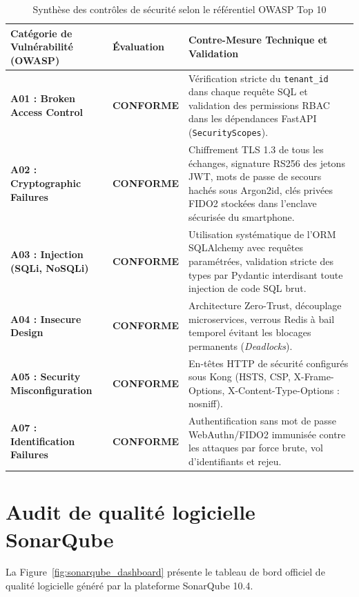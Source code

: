 \begin{table}[H]
\centering
\small
\renewcommand{\arraystretch}{1.3}
\begin{tabularx}{\textwidth}{|p{4.2cm}|p{2cm}|X|}
\hline
\textbf{Catégorie de Vulnérabilité (OWASP)} & \textbf{Évaluation} & \textbf{Contre-Mesure Technique et Validation} \\
\hline
\textbf{A01 : Broken Access Control} & \textbf{CONFORME} & Vérification stricte du \texttt{tenant\_id} dans chaque requête SQL et validation des permissions RBAC dans les dépendances FastAPI (\texttt{SecurityScopes}). \\
\hline
\textbf{A02 : Cryptographic Failures} & \textbf{CONFORME} & Chiffrement TLS 1.3 de tous les échanges, signature RS256 des jetons JWT, mots de passe de secours hachés sous Argon2id, clés privées FIDO2 stockées dans l'enclave sécurisée du smartphone. \\
\hline
\textbf{A03 : Injection (SQLi, NoSQLi)} & \textbf{CONFORME} & Utilisation systématique de l'ORM SQLAlchemy avec requêtes paramétrées, validation stricte des types par Pydantic interdisant toute injection de code SQL brut. \\
\hline
\textbf{A04 : Insecure Design} & \textbf{CONFORME} & Architecture Zero-Trust, découplage microservices, verrous Redis à bail temporel évitant les blocages permanents (\textit{Deadlocks}). \\
\hline
\textbf{A05 : Security Misconfiguration} & \textbf{CONFORME} & En-têtes HTTP de sécurité configurés sous Kong (HSTS, CSP, X-Frame-Options, X-Content-Type-Options : nosniff). \\
\hline
\textbf{A07 : Identification Failures} & \textbf{CONFORME} & Authentification sans mot de passe WebAuthn/FIDO2 immunisée contre les attaques par force brute, vol d'identifiants et rejeu. \\
\hline
\end{tabularx}
\caption{Synthèse des contrôles de sécurité selon le référentiel OWASP Top 10}
\label{tab:securite_owasp_detail}
\end{table}

\section{Audit de qualité logicielle SonarQube}

La Figure~\ref{fig:sonarqube_dashboard} présente le tableau de bord officiel de qualité logicielle généré par la plateforme SonarQube 10.4.

